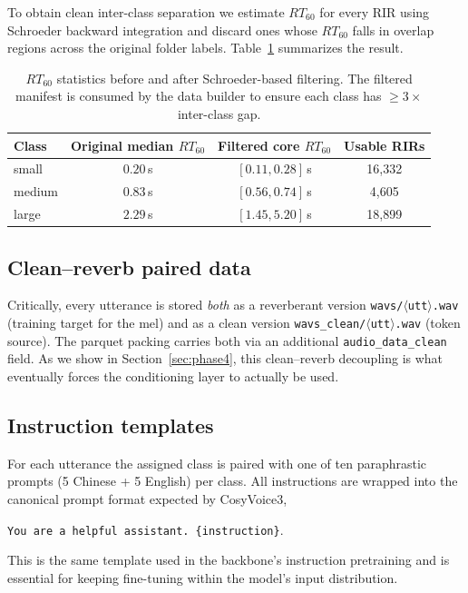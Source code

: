 \documentclass{article}
\begin{document}
To obtain clean inter-class separation we estimate $RT_{60}$ for every RIR
using Schroeder backward integration and discard ones whose $RT_{60}$ falls in
overlap regions across the original folder labels. Table~\ref{tab:rt60}
summarizes the result.

\begin{table}[h]
\centering
\small
\begin{tabular}{lccc}
\toprule
Class & Original median $RT_{60}$ & Filtered core $RT_{60}$ & Usable RIRs \\
\midrule
small  & $0.20$\,s & $[0.11, 0.28]$\,s & 16{,}332 \\
medium & $0.83$\,s & $[0.56, 0.74]$\,s & 4{,}605 \\
large  & $2.29$\,s & $[1.45, 5.20]$\,s & 18{,}899 \\
\bottomrule
\end{tabular}
\caption{$RT_{60}$ statistics before and after Schroeder-based filtering. The
filtered manifest is consumed by the data builder to ensure each class has
$\geq 3\times$ inter-class gap.}
\label{tab:rt60}
\end{table}

\subsection{Clean--reverb paired data}

Critically, every utterance is stored \emph{both} as a reverberant version
\texttt{wavs/$\langle$utt$\rangle$.wav} (training target for the mel) and as a
clean version \texttt{wavs\_clean/$\langle$utt$\rangle$.wav} (token source).
The parquet packing carries both via an additional \texttt{audio\_data\_clean}
field. As we show in Section~\ref{sec:phase4}, this clean--reverb decoupling
is what eventually forces the conditioning layer to actually be used.

\subsection{Instruction templates}

For each utterance the assigned class is paired with one of ten paraphrastic
prompts (5 Chinese + 5 English) per class. All instructions are wrapped into
the canonical prompt format expected by CosyVoice3,
\begin{center}
\texttt{You are a helpful assistant. \{instruction\}<|endofprompt|>}.
\end{center}
This is the same template used in the backbone's instruction pretraining and
is essential for keeping fine-tuning within the model's input distribution.
\end{document}
